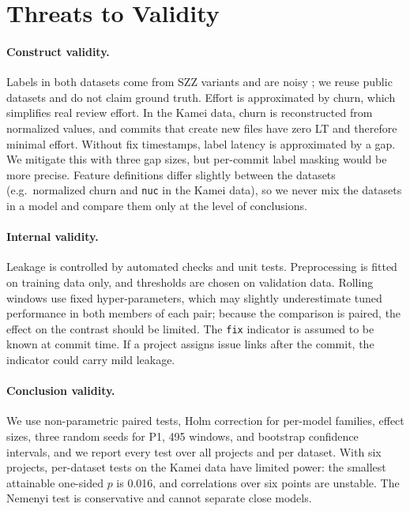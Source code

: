 \documentclass[11pt,a4paper]{article}
\begin{document}
\section{Threats to Validity}\label{sec:threats}

\paragraph{Construct validity.} Labels in both datasets come from SZZ variants and are noisy \citep{herbold2022}; we reuse public datasets and do not claim ground truth. Effort is approximated by churn, which simplifies real review effort. In the Kamei data, churn is reconstructed from normalized values, and commits that create new files have zero LT and therefore minimal effort. Without fix timestamps, label latency is approximated by a gap. We mitigate this with three gap sizes, but per-commit label masking would be more precise. Feature definitions differ slightly between the datasets (e.g.\ normalized churn and \texttt{nuc} in the Kamei data), so we never mix the datasets in a model and compare them only at the level of conclusions.

\paragraph{Internal validity.} Leakage is controlled by automated checks and unit tests. Preprocessing is fitted on training data only, and thresholds are chosen on validation data. Rolling windows use fixed hyper-parameters, which may slightly underestimate tuned performance in both members of each pair; because the comparison is paired, the effect on the contrast should be limited. The \texttt{fix} indicator is assumed to be known at commit time. If a project assigns issue links after the commit, the indicator could carry mild leakage.

\paragraph{Conclusion validity.} We use non-parametric paired tests, Holm correction for per-model families, effect sizes, three random seeds for P1, 495 windows, and bootstrap confidence intervals, and we report every test over all projects and per dataset. With six projects, per-dataset tests on the Kamei data have limited power: the smallest attainable one-sided $p$ is 0.016, and correlations over six points are unstable. The Nemenyi test is conservative and cannot separate close models.
\end{document}
